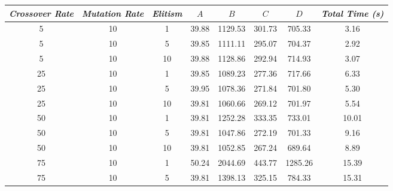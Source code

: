 

\begin{table}[h]
\centering
\footnotesize
{\renewcommand{\arraystretch}{1}}
\begin{tabular}{ccc|c|c|c|c|c}
\textit{Crossover Rate} & \textit{Mutation Rate} & \textit{Elitism} & $A$ & $B$ & $C$ & $D$ & \textit{Total Time (s)} \\\hline
5 & 10 & 1 & \cellcolor{gray!50}39.88 & \cellcolor{gray!13}1129.53 & \cellcolor{gray!1}301.73 & \cellcolor{gray!42}705.33 & 3.16\\
5 & 10 & 5 & \cellcolor{gray!50}39.85 & \cellcolor{gray!16}1111.11 & \cellcolor{gray!1}295.07 & \cellcolor{gray!42}704.37 & 2.92\\
5 & 10 & 10 & \cellcolor{gray!50}39.88 & \cellcolor{gray!13}1128.86 & \cellcolor{gray!1}292.94 & \cellcolor{gray!39}714.93 & 3.07\\
25 & 10 & 1 & \cellcolor{gray!50}39.85 & \cellcolor{gray!21}1089.23 & \cellcolor{gray!4}277.36 & \cellcolor{gray!38}717.66 & 6.33\\
25 & 10 & 5 & \cellcolor{gray!49}39.95 & \cellcolor{gray!23}1078.36 & \cellcolor{gray!10}271.84 & \cellcolor{gray!43}701.80 & 5.30\\
25 & 10 & 10 & \cellcolor{gray!50}39.81 & \cellcolor{gray!26}1060.66 & \cellcolor{gray!13}269.12 & \cellcolor{gray!43}701.97 & 5.54\\
50 & 10 & 1 & \cellcolor{gray!50}39.81 & \cellcolor{gray!1}1252.28 & \cellcolor{gray!1}333.35 & \cellcolor{gray!33}733.01 & 10.01\\
50 & 10 & 5 & \cellcolor{gray!50}39.81 & \cellcolor{gray!28}1047.86 & \cellcolor{gray!10}272.19 & \cellcolor{gray!43}701.33 & 9.16\\
50 & 10 & 10 & \cellcolor{gray!50}39.81 & \cellcolor{gray!27}1052.85 & \cellcolor{gray!15}267.24 & \cellcolor{gray!47}689.64 & 8.89\\
75 & 10 & 1 & \cellcolor{gray!1}50.24 & \cellcolor{gray!1}2044.69 & \cellcolor{gray!1}443.77 & \cellcolor{gray!1}1285.26 & 15.39\\
75 & 10 & 5 & \cellcolor{gray!50}39.81 & \cellcolor{gray!1}1398.13 & \cellcolor{gray!1}325.15 & \cellcolor{gray!17}784.33 & 15.31\\

\end{tabular}
\end{table}
